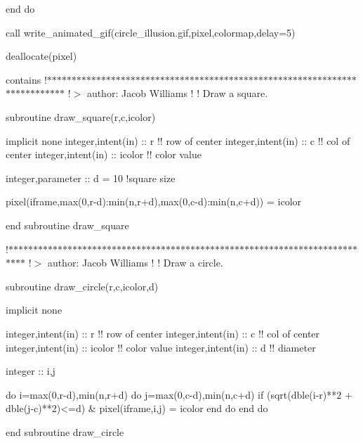 end do

call write\+\_\+animated\+\_\+gif(\textquotesingle{}circle\+\_\+illusion.\+gif\textquotesingle{},pixel,colormap,delay=5)

deallocate(pixel)

contains !$\ast$$\ast$$\ast$$\ast$$\ast$$\ast$$\ast$$\ast$$\ast$$\ast$$\ast$$\ast$$\ast$$\ast$$\ast$$\ast$$\ast$$\ast$$\ast$$\ast$$\ast$$\ast$$\ast$$\ast$$\ast$$\ast$$\ast$$\ast$$\ast$$\ast$$\ast$$\ast$$\ast$$\ast$$\ast$$\ast$$\ast$$\ast$$\ast$$\ast$$\ast$$\ast$$\ast$$\ast$$\ast$$\ast$$\ast$$\ast$$\ast$$\ast$$\ast$$\ast$$\ast$$\ast$$\ast$$\ast$$\ast$$\ast$$\ast$$\ast$$\ast$$\ast$$\ast$$\ast$$\ast$$\ast$$\ast$$\ast$$\ast$$\ast$$\ast$$\ast$$\ast$$\ast$$\ast$ !$>$ author\+: Jacob Williams ! ! Draw a square. \begin{DoxyVerb}subroutine draw_square(r,c,icolor)

implicit none
integer,intent(in) :: r      !! row of center
integer,intent(in) :: c      !! col of center
integer,intent(in) :: icolor !! color value

integer,parameter :: d = 10 !square size

pixel(iframe,max(0,r-d):min(n,r+d),max(0,c-d):min(n,c+d)) = icolor

end subroutine draw_square
\end{DoxyVerb}
 !$\ast$$\ast$$\ast$$\ast$$\ast$$\ast$$\ast$$\ast$$\ast$$\ast$$\ast$$\ast$$\ast$$\ast$$\ast$$\ast$$\ast$$\ast$$\ast$$\ast$$\ast$$\ast$$\ast$$\ast$$\ast$$\ast$$\ast$$\ast$$\ast$$\ast$$\ast$$\ast$$\ast$$\ast$$\ast$$\ast$$\ast$$\ast$$\ast$$\ast$$\ast$$\ast$$\ast$$\ast$$\ast$$\ast$$\ast$$\ast$$\ast$$\ast$$\ast$$\ast$$\ast$$\ast$$\ast$$\ast$$\ast$$\ast$$\ast$$\ast$$\ast$$\ast$$\ast$$\ast$$\ast$$\ast$$\ast$$\ast$$\ast$$\ast$$\ast$$\ast$$\ast$$\ast$$\ast$ !$>$ author\+: Jacob Williams ! ! Draw a circle. \begin{DoxyVerb}subroutine draw_circle(r,c,icolor,d)

implicit none

integer,intent(in) :: r      !! row of center
integer,intent(in) :: c      !! col of center
integer,intent(in) :: icolor !! color value
integer,intent(in) :: d      !! diameter

integer :: i,j

do i=max(0,r-d),min(n,r+d)
    do j=max(0,c-d),min(n,c+d)
        if (sqrt(dble(i-r)**2 + dble(j-c)**2)<=d) &
            pixel(iframe,i,j) = icolor
    end do
end do

end subroutine draw_circle
\end{DoxyVerb}
